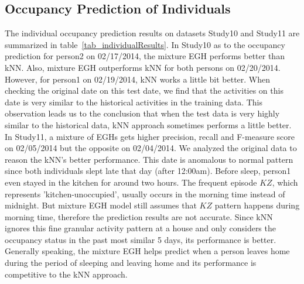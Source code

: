\subsection{Occupancy Prediction of Individuals}



The individual occupancy prediction results on datasets Study10 and Study11 are summarized in table~\ref{tab_individualResults}. 
In Study10 as to the occupancy prediction for person2 on 02/17/2014, the mixture EGH performs better than kNN. 
Also, mixture EGH outperforms kNN for both persons on 02/20/2014. 
However, for person1 on 02/19/2014, kNN works a little bit better. 
When checking the original date on this test date, 
we find that the activities on this date is very similar to the historical activities in the training data.
This observation leads us to the conclusion that when the test data is very highly similar to the historical data, 
kNN approach sometimes performs a little better.  
In Study11, a mixture of EGHs gets higher precision, recall and F-measure score on 02/05/2014 but the opposite on 02/04/2014. 
We analyzed the original data to reason the kNN's better performance. This date is anomalous to normal pattern since both individuals slept late that day (after 12:00am).
Before sleep, person1 even stayed in the kitchen for around two hours. 
The frequent episode $KZ$, which represents 'kitchen-unoccupied', 
usually occurs in the morning time instead of midnight. 
But mixture EGH model still assumes that $KZ$ pattern 
happens during morning time, 
therefore the prediction results are not accurate. 
Since kNN ignores this fine granular activity pattern at a house and only considers the occupancy status in the past most similar 5 days, its performance is better. 
Generally speaking, the mixture EGH helps predict when a person 
leaves home during the period of sleeping and leaving home and its 
performance is competitive to the kNN approach. 

